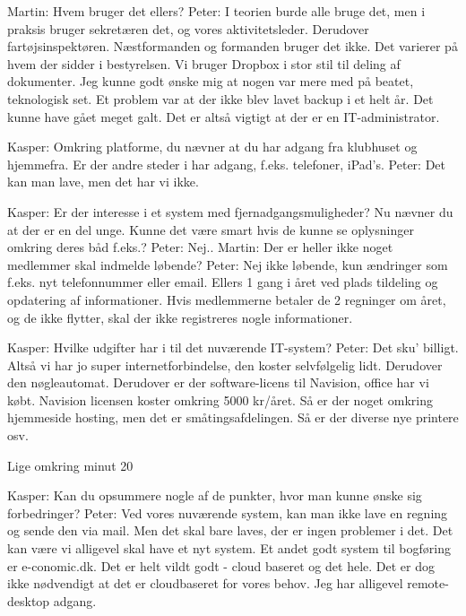 Martin: Hvem bruger det ellers?
Peter: I teorien burde alle bruge det, men i praksis bruger sekretæren det, og vores aktivitetsleder. Derudover fartøjsinspektøren. Næstformanden og formanden bruger det ikke. Det varierer på hvem der sidder i bestyrelsen. Vi bruger Dropbox i stor stil til deling af dokumenter. Jeg kunne godt ønske mig at nogen var mere med på beatet, teknologisk set. Et problem var at der ikke blev lavet backup i et helt år. Det kunne have gået meget galt. Det er altså vigtigt at der er en IT-administrator.

Kasper: Omkring platforme, du nævner at du har adgang fra klubhuset og hjemmefra. Er der andre steder i har adgang, f.eks. telefoner, iPad's.
Peter: Det kan man lave, men det har vi ikke.

Kasper: Er der interesse i et system med fjernadgangsmuligheder? Nu nævner du at der er en del unge. Kunne det være smart hvis de kunne se oplysninger omkring deres båd f.eks.?
Peter: Nej..
Martin: Der er heller ikke noget medlemmer skal indmelde løbende?
Peter: Nej ikke løbende, kun ændringer som f.eks. nyt telefonnummer eller email. Ellers 1 gang i året ved plads tildeling og opdatering af informationer. Hvis medlemmerne betaler de 2 regninger om året, og de ikke flytter, skal der ikke registreres nogle informationer.

Kasper: Hvilke udgifter har i til det nuværende IT-system?
Peter: Det sku' billigt. Altså vi har jo super internetforbindelse, den koster selvfølgelig lidt. Derudover den nøgleautomat. Derudover er der software-licens til Navision, office har vi købt. Navision licensen koster omkring 5000 kr/året. Så er der noget omkring hjemmeside hosting, men det er småtingsafdelingen. Så er der diverse nye printere osv.

Lige omkring minut 20

Kasper: Kan du opsummere nogle af de punkter, hvor man kunne ønske sig forbedringer?
Peter: Ved vores nuværende system, kan man ikke lave en regning og sende den via mail. Men det skal bare laves, der er ingen problemer i det. Det kan være vi alligevel skal have et nyt system. Et andet godt system til bogføring er e-conomic.dk. Det er helt vildt godt - cloud baseret og det hele. Det er dog ikke nødvendigt at det er cloudbaseret for vores behov. Jeg har alligevel remote-desktop adgang.

